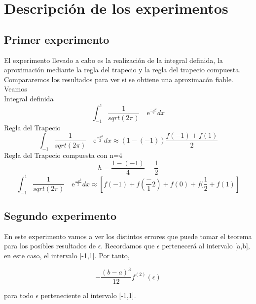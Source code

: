 


\section{Descripción de los experimentos}
\label{3:sec:1}
\parindent=1cm
\raggedright
\subsection{Primer experimento}
El experimento llevado a cabo es la realización de la integral definida, la aproximación
mediante la regla del trapecio y la regla del trapecio compuesta. Compararemos los resultados para ver si se obtiene una aproximacón fiable.
 Veamos\\
Integral definida 
\[
\int_{-1}^{1} \frac{1}{sqrt(2\pi)} \quad\text{e}^{\frac{-x^2}{2}}dx
\]
Regla del Trapecio
\[
\int_{-1}^{} \frac{1}{sqrt(2\pi)} \quad\text{e}^{\frac{-x^2}{2}}dx\approx\left(1-(-1)\right)\frac{f(-1)+f(1)}{2}
\]
Regla del Trapecio compuesta con n=4
\[
h=\frac{1-(-1)}{4} =\frac{1}{2} 
\]
\[
\int_{-1}^{1} \frac{1}{sqrt(2\pi)} \quad\text{e}^{\frac{-x^2}{2}}dx\approx\left[f(-1) + f(\frac-{1}{2}) + f(0) + f(\frac{1}{2} + f(1)\right]
\]


\subsection{Segundo experimento}
En este experimento vamos a ver los distintos errores que puede tomar el teorema para los posibles resultados de $\epsilon$.
Recordamos que $\epsilon$ pertenecerá al intervalo [a,b], en este caso, el intervalo [-1,1].
Por tanto,

\[
-\frac{\left(b-a\right)^3}{12}  \displaystyle f^{(2)}(\epsilon)
\]

para todo $\epsilon$ perteneciente al intervalo [-1,1].



